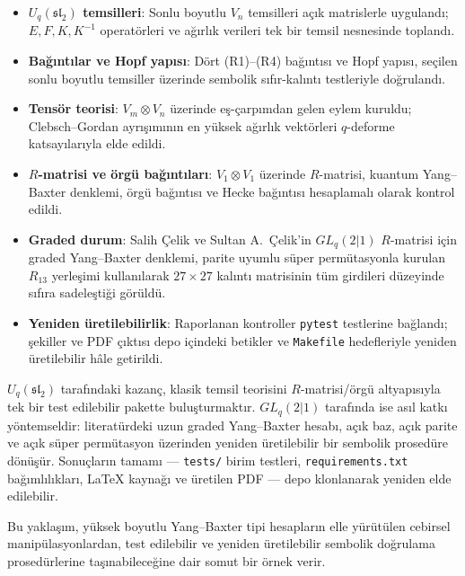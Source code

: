 \documentclass[10pt]{math}
\numberwithin{equation}{section}
\theoremstyle{plain}
\theoremstyle{definition}
\renewcommand{\sl}{\mathfrak{sl}}
\newcommand{\Uq}{U_q(\sl_2)}
\begin{document}
\begin{itemize}[leftmargin=*]
  \item \textbf{$\Uq$ temsilleri}: Sonlu boyutlu $V_n$ temsilleri açık
        matrislerle uygulandı; $E,F,K,K^{-1}$ operatörleri ve ağırlık verileri
        tek bir temsil nesnesinde toplandı.
  \item \textbf{Bağıntılar ve Hopf yapısı}: Dört (R1)--(R4) bağıntısı ve Hopf
        yapısı, seçilen sonlu boyutlu temsiller üzerinde sembolik
        sıfır-kalıntı testleriyle doğrulandı.
  \item \textbf{Tensör teorisi}: $V_m \otimes V_n$ üzerinde eş-çarpımdan gelen
        eylem kuruldu; Clebsch--Gordan ayrışımının en yüksek ağırlık vektörleri
        $q$-deforme katsayılarıyla elde edildi.
  \item \textbf{$R$-matrisi ve örgü bağıntıları}: $V_1 \otimes V_1$ üzerinde
        $R$-matrisi, kuantum Yang--Baxter denklemi, örgü bağıntısı ve Hecke
        bağıntısı hesaplamalı olarak kontrol edildi.
  \item \textbf{Graded durum}: Salih Çelik ve Sultan A.\ Çelik'in
        $GL_q(2|1)$ $R$-matrisi için graded Yang--Baxter denklemi, parite
        uyumlu süper permütasyonla kurulan $R_{13}$ yerleşimi kullanılarak
        $27\times 27$ kalıntı matrisinin tüm girdileri düzeyinde sıfıra
        sadeleştiği görüldü.
  \item \textbf{Yeniden üretilebilirlik}: Raporlanan kontroller
        \texttt{pytest} testlerine bağlandı; şekiller ve PDF çıktısı depo
        içindeki betikler ve \texttt{Makefile} hedefleriyle yeniden üretilebilir
        hâle getirildi.
\end{itemize}

$\Uq$ tarafındaki kazanç, klasik temsil teorisini $R$-matrisi/örgü altyapısıyla
tek bir test edilebilir pakette buluşturmaktır. $GL_q(2|1)$ tarafında ise asıl
katkı yöntemseldir: literatürdeki uzun graded Yang--Baxter hesabı, açık baz,
açık parite ve açık süper permütasyon üzerinden yeniden üretilebilir bir sembolik
prosedüre dönüşür. Sonuçların tamamı --- \texttt{tests/} birim testleri,
\texttt{requirements.txt} bağımlılıkları, LaTeX kaynağı ve üretilen PDF --- depo
klonlanarak yeniden elde edilebilir.

Bu yaklaşım, yüksek boyutlu Yang--Baxter tipi hesapların elle yürütülen
cebirsel manipülasyonlardan, test edilebilir ve yeniden üretilebilir sembolik
doğrulama prosedürlerine taşınabileceğine dair somut bir örnek verir.
\end{document}
